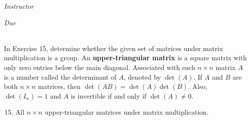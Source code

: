 \documentclass[12pt, oneside]{book}
\newenvironment{solution}{\textit{Solution.}}
\newcommand{\sol}[1]{
    \begin{customframedproof}[linecolor=orangehdx!75,]
        \begin{solution}
        #1
        \end{solution}
    \end{customframedproof}
}
\begin{document}
\begin{titlepage}
\begin{center}
\begin{large}
            \vspace*{1\baselineskip}

            \textit{Instructor} \\[1ex] %
            \professor

            \vspace*{1\baselineskip}

            \textit{Due}\\[1ex]
            {\scshape  \finaldate} \\[0.3\baselineskip] %

            \thispagestyle{empty}

        \end{large}
    \end{center}
\end{titlepage}
In Exercise 15, determine whether the given set of matrices under matrix multiplication is a group. An \textbf{upper-triangular matrix} is a square matrix with only zero entries below the main diagonal. Associated with each \(n \times n\) matrix \(A\) is a number called the determinant of \(A\), denoted by \(\det(A)\). If \(A\) and \(B\) are both \(n \times n\) matrices, then \(\det(AB) = \det(A) \det(B)\). Also, \(\det(I_{n}) = 1\) and \(A\) is invertible if and only if \(\det(A) \ne 0\).

\begin{enumerate}
    \setcounter{enumi}{14}
    \item All \(n \times n\) upper-triangular matrices under matrix multiplication.

\end{enumerate}
\end{document}
